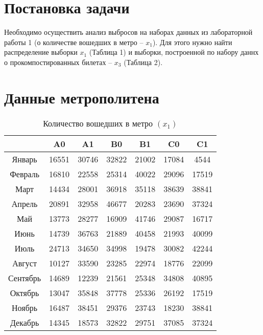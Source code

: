 \section{Постановка задачи}
    Необходимо осуществить анализ выбросов на наборах данных из лабораторной работы 1 (о количестве вошедших в метро -- $x_1$).
    Для этого нужно найти распределение выборки $x_1$ (Таблица 1) и выборки, построенной по набору даннх о прокомпостированных билетах -- $x_3$ (Таблица 2).

\section{Данные метрополитена} %
        \begin{table}[h!]%
        \centering
            \begin{tabular}{|c|c|c|c|c|c|c|} \hline
                     &   A0  &   A1  &   B0  &   B1  &   C0  &   C1  \\ \hline
            Январь   & 16551 & 30746 & 32822 & 21002 & 17084 & 4544  \\ \hline
            Февраль  & 16810 & 22558 & 25314 & 40022 & 29096 & 17519 \\ \hline
            Март     & 14434 & 28001 & 36918 & 35118 & 38639 & 38841 \\ \hline
            Апрель   & 20891 & 32958 & 46677 & 20283 & 23690 & 37324 \\ \hline
            Май      & 13773 & 28277 & 16909 & 41746 & 29087 & 16717 \\ \hline
            Июнь     & 14739 & 36763 & 21889 & 40458 & 21993 & 40099 \\ \hline
            Июль     & 24713 & 34650 & 34998 & 19478 & 30082 & 42244 \\ \hline
            Август   & 10127 & 33590 & 23285 & 22974 & 18776 & 22099 \\ \hline
            Сентябрь & 14689 & 12239 & 21561 & 25348 & 34808 & 40895 \\ \hline
            Октябрь  & 13047 & 35848 & 37778 & 25336 & 26192 & 17519 \\ \hline
            Ноябрь   & 16487 & 38451 & 29376 & 23743 & 18230 & 38841 \\ \hline
            Декабрь  & 14345 & 18573 & 32822 & 29751 & 37085 & 37324 \\ \hline
            \end{tabular}
        \caption{Количество вошедших в метро $(x_1)$}
        \end{table}

